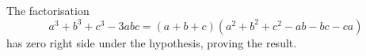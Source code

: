 The factorisation
\[
a^3+b^3+c^3-3abc=(a+b+c)(a^2+b^2+c^2-ab-bc-ca)
\]
has zero right side under the hypothesis, proving the result.
